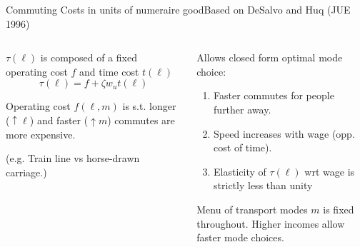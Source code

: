 \documentclass[aspectratio=169]{beamer}
\begin{document}
\begin{frame}{Commuting Costs in units of numeraire good}{Based on DeSalvo and Huq (JUE 1996)}

\begin{columns}
\begin{column}{0.5\textwidth}
\begin{midi}
\item $\tau(\ell)$ is composed of a fixed operating cost $f$ and time cost $t(\ell)$
\begin{equation*}
\tau(\ell) = f + \zeta w_u t(\ell)
\end{equation*}
\item Operating cost $f(\ell,m)$ is s.t. longer ($\uparrow \ell$) and faster ($\uparrow m$) commutes are more expensive.
\item (e.g. Train line vs horse-drawn carriage.)
\end{midi}
\end{column}
\pause
\begin{column}{0.5\textwidth}
\begin{midi}
\item Allows closed form optimal mode choice:
\begin{enumerate}
\item Faster commutes for people further away.
\item Speed increases with wage (opp. cost of time).
\item Elasticity of $\tau(\ell)$ wrt wage is strictly less than unity%
\end{enumerate}
\item Menu of transport modes $m$ is fixed throughout. Higher incomes allow faster mode choices.
\end{midi}

\end{column}
\end{columns}

\end{frame}
\end{document}
